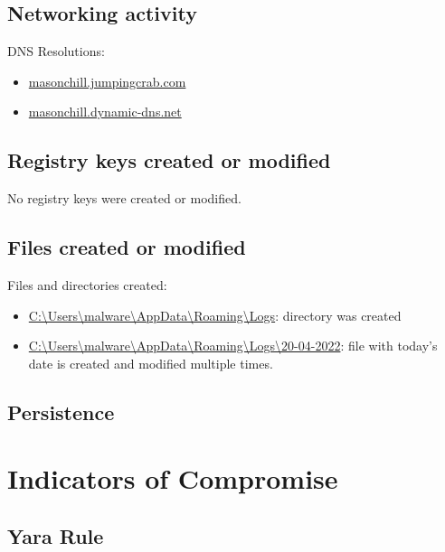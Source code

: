 \documentclass{article}
\begin{document}
    \subsection{Networking activity}
    DNS Resolutions:
    \begin{itemize}
        \item \url{masonchill.jumpingcrab.com}
        \item \url{masonchill.dynamic-dns.net}
    \end{itemize}
    \subsection{Registry keys created or modified}
    No registry keys were created or modified.
    \subsection{Files created or modified}
    Files and directories created:
    \begin{itemize}
        \item \url{C:\Users\malware\AppData\Roaming\Logs}: directory was created
        \item \url{C:\Users\malware\AppData\Roaming\Logs\20-04-2022}: file with today's date is created and modified multiple times.
    \end{itemize}
    \subsection{Persistence}
    \pagebreak
    \section{Indicators of Compromise}
    \subsection{Yara Rule}
    \pagebreak
    \printbibliography
\end{document}
